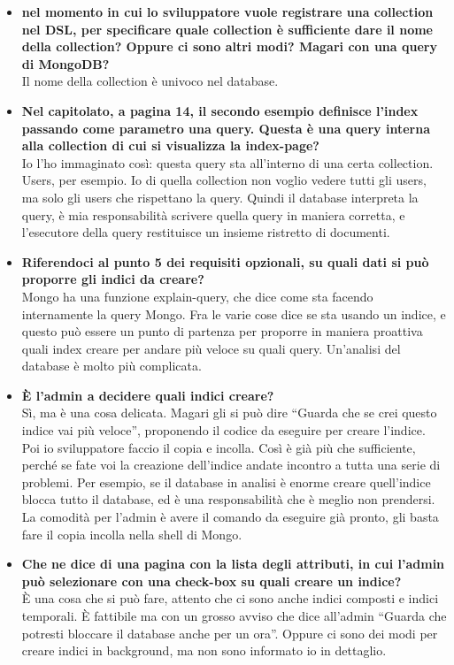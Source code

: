 \begin{itemize}
		\item
		{\bfseries nel momento in cui lo sviluppatore vuole registrare una collection nel DSL, per specificare quale collection è sufficiente dare il nome della collection? Oppure ci sono altri modi? Magari con una query di MongoDB?} \\
		Il nome della collection è univoco nel database.
		
		\item
		{\bfseries Nel capitolato, a pagina 14, il secondo esempio definisce l'index passando come parametro una query. Questa è una query interna alla collection di cui si visualizza la index-page?} \\
		Io l'ho immaginato così: questa query sta all'interno di una certa collection. Users, per esempio. Io di quella collection non voglio vedere tutti gli users, ma solo gli users che rispettano la query. Quindi il database interpreta la query, è mia responsabilità scrivere quella query in maniera corretta, e l'esecutore della query restituisce un insieme ristretto di documenti.
		
		\item
		{\bfseries Riferendoci al punto 5 dei requisiti opzionali, su quali dati si può proporre gli indici da creare?} \\
		Mongo ha una funzione explain-query, che dice come sta facendo internamente la query Mongo. Fra le varie cose dice se sta usando un indice, e questo può essere un punto di partenza per proporre in maniera proattiva quali index creare per andare più veloce su quali query. Un'analisi del database è molto più complicata.
		
		\item
		{\bfseries È l'admin a decidere quali indici creare?} \\
		Sì, ma è una cosa delicata. Magari gli si può dire ``Guarda che se crei questo indice vai più veloce'', proponendo il codice da eseguire per creare l'indice. Poi io sviluppatore faccio il copia e incolla. Così è già più che sufficiente, perché se fate voi la creazione dell'indice andate incontro a tutta una serie di problemi. Per esempio, se il database in analisi è enorme creare quell'indice blocca tutto il database, ed è una responsabilità che è meglio non prendersi. La comodità per l'admin è avere il comando da eseguire già pronto, gli basta fare il copia incolla nella shell di Mongo.
		
		\item
		{\bfseries Che ne dice di una pagina con la lista degli attributi, in cui l'admin può selezionare con una check-box su quali creare un indice?} \\
		È una cosa che si può fare, attento che ci sono anche indici composti e indici temporali. È fattibile ma con un grosso avviso che dice all'admin ``Guarda che potresti bloccare il database anche per un ora''. Oppure ci sono dei modi per creare indici in background, ma non sono informato io in dettaglio.
		

\end{itemize}
